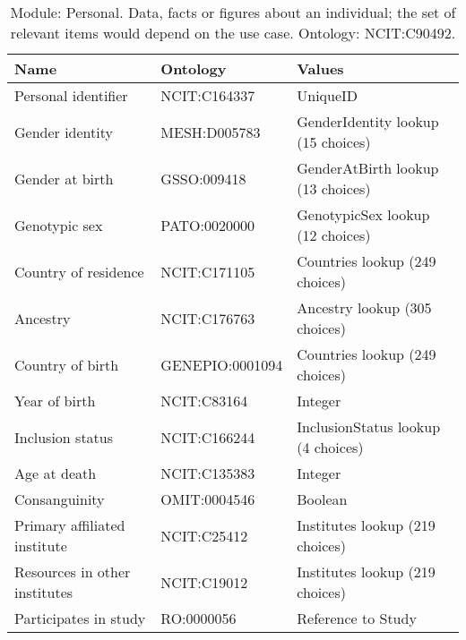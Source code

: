 \documentclass{article}
\begin{document}
\begin{table}[htb]
\begin{tabular}{lll}
Name & Ontology & Values \\
\hline
Personal identifier & NCIT:C164337 & UniqueID \\
Gender identity & MESH:D005783 & GenderIdentity lookup (15 choices) \\
Gender at birth & GSSO:009418 & GenderAtBirth lookup (13 choices) \\
Genotypic sex & PATO:0020000 & GenotypicSex lookup (12 choices) \\
Country of residence & NCIT:C171105 & Countries lookup (249 choices) \\
Ancestry & NCIT:C176763 & Ancestry lookup (305 choices) \\
Country of birth & GENEPIO:0001094 & Countries lookup (249 choices) \\
Year of birth & NCIT:C83164 & Integer \\
Inclusion status & NCIT:C166244 & InclusionStatus lookup (4 choices) \\
Age at death & NCIT:C135383 & Integer \\
Consanguinity & OMIT:0004546 & Boolean \\
Primary affiliated institute & NCIT:C25412 & Institutes lookup (219 choices) \\
Resources in other institutes & NCIT:C19012 & Institutes lookup (219 choices) \\
Participates in study & RO:0000056 & Reference to Study \\
\hline
\end{tabular}
\caption[Module: Personal]{\label{table:table3} Module: Personal. Data, facts or figures about an individual; the set of relevant items would depend on the use case. Ontology: NCIT:C90492. }
\end{table}
\end{document}
